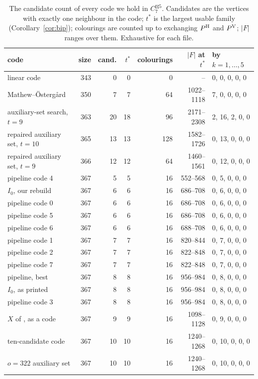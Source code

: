 \begin{table}[t]
\centering\footnotesize\setlength{\tabcolsep}{3pt}
\begin{tabular}{@{}lrrrrrl@{}}
\toprule
code & size & cand. & $t^*$ & colourings & $|F|$ at $t^*$ & by $k=1,\dots,5$ \\
\midrule
linear code \cite{baumert1971} & 343 & 0 & 0 & 0 & -- & 0, 0, 0, 0, 0 \\
Mathew--\"Osterg{\aa}rd \cite{mathew2017} & 350 & 7 & 7 & 64 & 1022--1118 & 7, 0, 0, 0, 0 \\
auxiliary-set search, $t=9$ & 363 & 20 & 18 & 96 & 2171--2308 & 2, 16, 2, 0, 0 \\
repaired auxiliary set, $t=10$ & 365 & 13 & 13 & 128 & 1582--1726 & 0, 13, 0, 0, 0 \\
repaired auxiliary set, $t=9$ & 366 & 12 & 12 & 64 & 1460--1561 & 0, 12, 0, 0, 0 \\
pipeline code 4 & 367 & 5 & 5 & 16 & 552--568 & 0, 5, 0, 0, 0 \\
$I_0$, our rebuild & 367 & 6 & 6 & 16 & 686--708 & 0, 6, 0, 0, 0 \\
pipeline code 0 & 367 & 6 & 6 & 16 & 686--708 & 0, 6, 0, 0, 0 \\
pipeline code 5 & 367 & 6 & 6 & 16 & 686--708 & 0, 6, 0, 0, 0 \\
pipeline code 6 & 367 & 6 & 6 & 16 & 688--708 & 0, 6, 0, 0, 0 \\
pipeline code 1 & 367 & 7 & 7 & 16 & 820--844 & 0, 7, 0, 0, 0 \\
pipeline code 2 & 367 & 7 & 7 & 16 & 822--848 & 0, 7, 0, 0, 0 \\
pipeline code 7 & 367 & 7 & 7 & 16 & 822--848 & 0, 7, 0, 0, 0 \\
pipeline, best & 367 & 8 & 8 & 16 & 956--984 & 0, 8, 0, 0, 0 \\
$I_0$, as printed \cite{polak2019} & 367 & 8 & 8 & 16 & 956--984 & 0, 8, 0, 0, 0 \\
pipeline code 3 & 367 & 8 & 8 & 16 & 956--984 & 0, 8, 0, 0, 0 \\
$X$ of \cite{gao2026}, as a code & 367 & 9 & 9 & 16 & 1098--1128 & 0, 9, 0, 0, 0 \\
ten-candidate code & 367 & 10 & 10 & 16 & 1240--1268 & 0, 10, 0, 0, 0 \\
$o=322$ auxiliary set & 367 & 10 & 10 & 16 & 1240--1268 & 0, 10, 0, 0, 0 \\
\bottomrule
\end{tabular}
\caption{The candidate count of every code we hold in $C_7^{\boxtimes 5}$. Candidates are the vertices with exactly one neighbour in the code; $t^*$ is the largest usable family (Corollary~\ref{cor:bip}); colourings are counted up to exchanging $P^{\mathrm H}$ and $P^{\mathrm V}$; $|F|$ ranges over them. Exhaustive for each file.}
\label{tab:codes}
\end{table}
